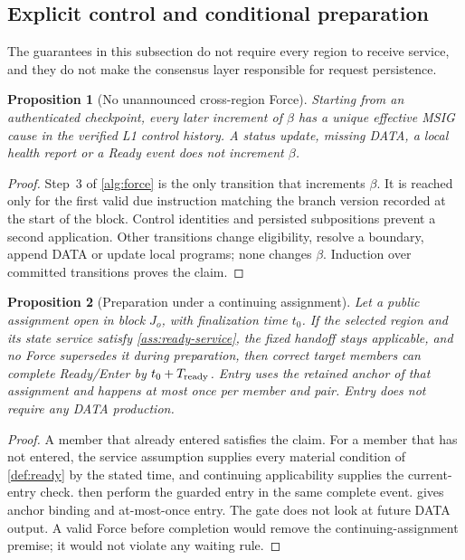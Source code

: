 \documentclass[11pt,a4paper]{article}
\newtheorem{proposition}[proposition]{Proposition}
\begin{document}
\subsection{Explicit control and conditional preparation}
\label{sec:liveness}
The guarantees in this subsection do not require every region to receive
service, and they do not make the consensus layer responsible for
request persistence.

\begin{proposition}[No unannounced cross-region Force]
\label{prop:explicit-force}
Starting from an authenticated checkpoint, every later increment of
$\beta$ has a unique effective MSIG cause in the verified L1 control
history. A status update, missing DATA, a local health report or a Ready
event does not increment $\beta$.
\end{proposition}
\begin{proof}
Step~3 of \cref{alg:force} is the only transition that increments
$\beta$. It is reached only for the first valid due instruction matching
the branch version recorded at the start of the block. Control identities
and persisted subpositions prevent a second application. Other
transitions change eligibility, resolve a boundary, append DATA or update
local programs; none changes $\beta$. Induction over committed
transitions proves the claim.
\end{proof}

\begin{proposition}[Preparation under a continuing assignment]
\label{prop:ready-bound}
Let a public assignment open in block $J_o$, with finalization time
$t_0$. If the selected region and its state service satisfy
\cref{ass:ready-service}, the fixed handoff stays applicable, and no
Force supersedes it during preparation, then correct target members can
complete Ready/Enter by $t_0+T_{\rm ready}$. Entry uses the retained
anchor of that assignment and happens at most once per member and pair.
Entry does not require any DATA production.
\end{proposition}
\begin{proof}
A member that already entered satisfies the claim. For a member that has
not entered, the service assumption supplies every material condition of
\cref{def:ready} by the stated time, and continuing applicability
supplies the current-entry check.  then
perform the guarded entry in the same complete event.
 gives anchor binding and at-most-once
entry. The gate does not look at future DATA output. A valid Force before
completion would remove the continuing-assignment premise; it would not
violate any waiting rule.
\end{proof}
\end{document}
